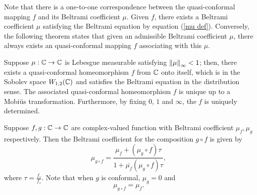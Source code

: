 \documentclass[review,onefignum,onetabnum]{siamonline190516}
\begin{document}
Note that there is a one-to-one correspondence between the quasi-conformal mapping $f$ and its Beltrami coefficient $\mu$. Given $f$, there exists a Beltrami coefficient $\mu$ satisfying the Beltrami equation by equation (\ref{mu def}). Conversely, the following theorem states that given an admissible Beltrami coefficient $\mu$, there always exists an quasi-conformal mapping $f$ associating with this $\mu$.

\begin{theorem}\label{Measurable Riemannian Mapping Theorem}
    Suppose $\mu : \mathbb{C} \rightarrow \mathbb{C}$ is Lebesgue measurable satisfying $\left\Vert \mu \right\Vert_\infty <1$; then, there exists a quasi-conformal homeomorphism $f$ from $\mathbb{C}$ onto itself, which is in the Sobolev space $W_{1,2}(\mathbb{C})$ and satisfies the Beltrami equation in the distribution sense. The associated quasi-conformal homeomorphism $f$ is unique up to a Mobi\"us transformation. Furthermore, by fixing $0$, $1$ and $\infty$, the $f$ is uniquely determined.
\end{theorem}

Suppose $f, g: \mathbb{C} \rightarrow \mathbb{C}$ are complex-valued function with Beltrami coefficient $\mu_f, \mu_g$ respectively. Then the Beltrami coefficient for the composition $g \circ f$ is given by 
\begin{equation}\label{mu of composition}
    \mu_{g \circ f} = \frac{\mu_f+(\mu_g \circ f) \tau}{1+\overline{\mu_f}(\mu_g \circ f) \tau},
\end{equation}
where $\tau = \frac{\overline{f_z}}{f_z}$. Note that when $g$ is conformal, $\mu_g = 0$ and 
\begin{equation}\label{mu of conformal composition}
    \mu_{g \circ f} = \mu_f.
\end{equation}

\end{document}
